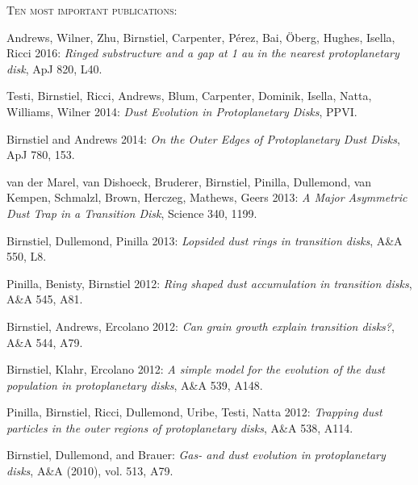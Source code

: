 \documentclass[10pt,fleqn,twoside]{article}
\newcommand{\litanf}{\begin{list}{}{\leftmargin=1.0cm \rightmargin=0cm
\itemindent=-1.0cm \parsep=0cm \itemsep=0cm }}
\newcommand{\litend}{\end{list}}
\begin{document}
\small
\noindent
\textsc{Ten most important publications}:
\litanf
\item Andrews, Wilner, Zhu, Birnstiel, Carpenter, Pérez, Bai, Öberg, Hughes, Isella, Ricci 2016: \textit{Ringed substructure and a gap at 1 au in the nearest protoplanetary disk}, ApJ 820, L40.
\\
\item Testi, Birnstiel, Ricci, Andrews, Blum, Carpenter, Dominik, Isella, Natta, Williams, Wilner 2014: \textit{Dust Evolution in Protoplanetary Disks}, PPVI.
\\
\item Birnstiel and Andrews 2014: \textit{On the Outer Edges of Protoplanetary Dust Disks}, ApJ 780, 153.
\\
\item van der Marel, van Dishoeck, Bruderer, Birnstiel, Pinilla, Dullemond, van Kempen, Schmalzl, Brown, Herczeg, Mathews, Geers 2013: \textit{A Major Asymmetric Dust Trap in a Transition Disk}, Science 340, 1199.
\\
\item Birnstiel, Dullemond, Pinilla 2013: \textit{Lopsided dust rings in transition disks}, A\&A 550, L8.
\\
\item Pinilla, Benisty, Birnstiel 2012: \textit{Ring shaped dust accumulation in transition disks}, A\&A 545, A81.
\\
\item Birnstiel, Andrews, Ercolano 2012: \textit{Can grain growth explain transition disks?}, A\&A 544, A79.
\\
\item Birnstiel, Klahr, Ercolano 2012: \textit{A simple model for the evolution of the dust population in protoplanetary disks}, A\&A 539, A148.
\\
\item Pinilla, Birnstiel, Ricci, Dullemond, Uribe, Testi, Natta 2012: \textit{Trapping dust particles in the outer regions of protoplanetary disks}, A\&A 538, A114.
\\
\item Birnstiel, Dullemond, and Brauer: \textit{Gas- and dust evolution in protoplanetary disks}, A\&A (2010), vol. 513, A79.

\litend
\normalsize
\vspace{5mm}
\end{document}
